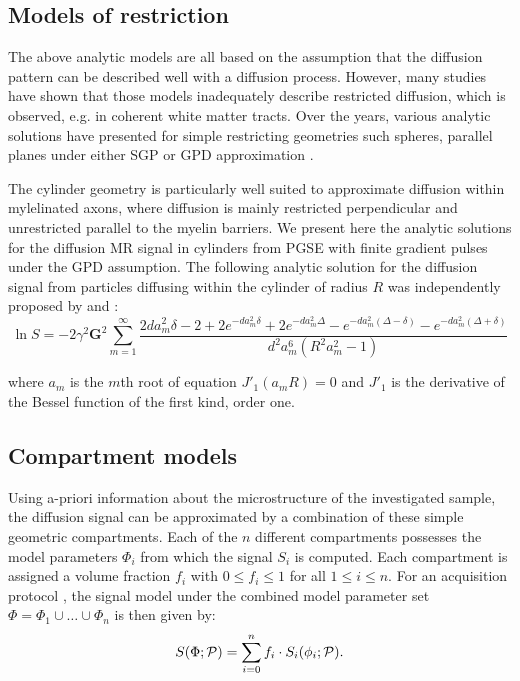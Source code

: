 \subsection{Models of restriction}
The above analytic models are all based on the assumption that the diffusion pattern can be described well with a diffusion process. However, many studies have shown that those models inadequately describe restricted diffusion, which is observed, e.g. in coherent white matter tracts. Over the years, various analytic solutions have presented for simple restricting geometries such spheres, parallel planes under either SGP or GPD approximation \citep{Balinov:1993, Linse:1995, Callaghan:1996}.

The cylinder geometry is particularly well suited to approximate diffusion within mylelinated axons, where diffusion is mainly restricted perpendicular and unrestricted parallel to the myelin barriers. We present here the analytic solutions for the diffusion MR signal in cylinders from PGSE with finite gradient pulses under the \gls{GPD} assumption. The following analytic solution for the diffusion signal from particles diffusing within the cylinder of radius $R$ was independently proposed by \citet{Stepisnik:1993} and \citet{Vangelderen:1994}:
{\scriptsize
\begin{equation}
\ln S = -2\gamma^{2}\textbf{G}^{2}\sum_{m=1}^{\infty}\frac{2da_{m}^{2}\delta-2+2e^{-da_{m}^{2}\delta}+2e^{-da_{m}^{2}\Delta}- e^{-da_{m}^{2}(\Delta-\delta)} -e^{-da_{m}^{2}(\Delta+\delta)}}{d^{2}a_{m}^{6}(R^{2}a_{m}^{2}- 1)}
\label{biganal}
\end{equation}
}

where  $a_{m}$ is the $m$th root of equation  $J'_{1}(a_{m}R)= 0$ and $J'_{1}$ is the derivative of the Bessel function of the first kind, order one.

\subsection{Compartment models}
\label{sec:multicompartment_modeling}
Using a-priori information about the microstructure of the investigated sample, the diffusion signal can be approximated by a combination of these simple geometric compartments. Each of the $n$ different compartments possesses the model parameters $\Phi_{i}$ from which the signal $S_i$ is computed. Each compartment is assigned a volume fraction $f_i$ with $0 \le f_i \le 1$ for all $1 \le i \le n$. For an acquisition protocol \prot{}, the signal model under the combined model parameter set $\Phi=\Phi_{1}\cup\dots\cup\Phi_{n}$ is then given by:
\begin{equation}
	S(\Phi;\mathcal{P})=\sum_{i=0}^{n}f_i\cdot S_i(\phi_i;\mathcal{P}).
\end{equation}

